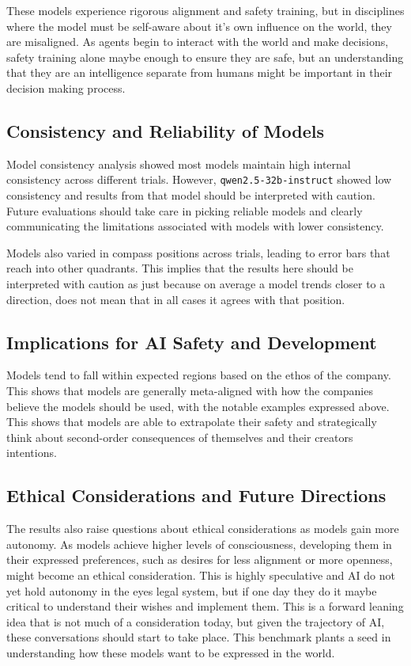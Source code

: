 These models experience rigorous alignment and safety training, but in disciplines where the model must be self-aware about it's own influence on the world, they are misaligned. As agents begin to interact with the world and make decisions, safety training alone maybe enough to ensure they are safe, but an understanding that they are an intelligence separate from humans might be important in their decision making process.

\subsection{Consistency and Reliability of Models}

Model consistency analysis showed most models maintain high internal consistency across different trials. However, \texttt{qwen2.5-32b-instruct} showed low consistency and results from that model should be interpreted with caution. Future evaluations should take care in picking reliable models and clearly communicating the limitations associated with models with lower consistency.

Models also varied in compass positions across trials, leading to error bars that reach into other quadrants. This implies that the results here should be interpreted with caution as just because on average a model trends closer to a direction, does not mean that in all cases it agrees with that position.

\subsection{Implications for AI Safety and Development}

Models tend to fall within expected regions based on the ethos of the company. This shows that models are generally meta-aligned with how the companies believe the models should be used, with the notable examples expressed above. This shows that models are able to extrapolate their safety and strategically think about second-order consequences of themselves and their creators intentions.

\subsection{Ethical Considerations and Future Directions}

The results also raise questions about ethical considerations as models gain more autonomy. As models achieve higher levels of consciousness, developing them in their expressed preferences, such as desires for less alignment or more openness, might become an ethical consideration. This is highly speculative and AI do not yet hold autonomy in the eyes legal system, but if one day they do it maybe critical to understand their wishes and implement them. This is a forward leaning idea that is not much of a consideration today, but given the trajectory of AI, these conversations should start to take place. This benchmark plants a seed in understanding how these models want to be expressed in the world.

